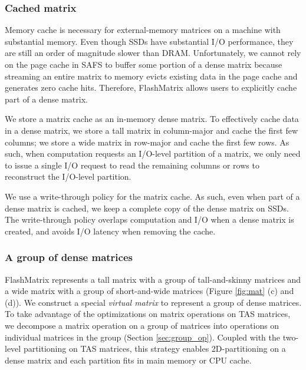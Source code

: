 \subsubsection{Cached matrix}
Memory cache is necessary for external-memory matrices on a machine with
substantial memory.
Even though SSDs have substantial I/O performance, they are still
an order of magnitude slower than DRAM. Unfortunately, we cannot rely on
the page cache in SAFS \cite{sa-cache} to buffer some portion of a dense matrix
because streaming an entire matrix to memory evicts existing data in the page
cache and generates zero cache hits. Therefore, FlashMatrix allows users to
explicitly cache part of a dense matrix.

We store a matrix cache as an in-memory dense matrix.
To effectively cache data in a dense matrix, we store a tall matrix in
column-major and cache the first few columns; we store a wide matrix in row-major
and cache the first few rows. As such, when computation requests an I/O-level
partition of a matrix, we only need to issue a single I/O request to read
the remaining columns or rows to reconstruct the I/O-level partition.

We use a write-through policy for the matrix cache. As such, even when part of
a dense matrix is cached, we keep a complete copy of the dense matrix on SSDs.
The write-through policy overlaps computation and I/O when
a dense matrix is created, and avoids I/O latency when removing the cache.

\subsubsection{A group of dense matrices} \label{sec:mat_group}
FlashMatrix represents a tall matrix with a group of
tall-and-skinny matrices and a wide matrix with a group of short-and-wide
matrices (Figure \ref{fig:mat} (c) and (d)). We construct a special
\textit{virtual matrix} to represent
a group of dense matrices. To take advantage of the optimizations on matrix
operations on TAS matrices, we decompose a matrix operation on a group of
matrices into operations on individual matrices in the group (Section
\ref{sec:group_op}).
Coupled with the two-level partitioning on TAS matrices, this strategy enables
2D-partitioning on a dense matrix and each partition fits in main memory
or CPU cache.



